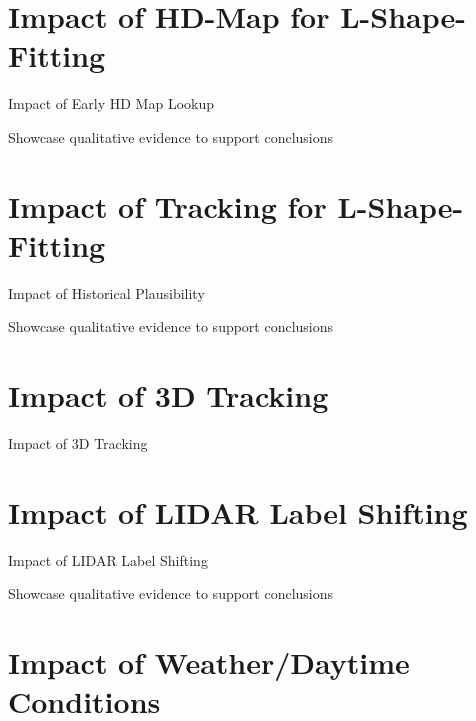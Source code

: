 \newpage


\section{Impact of HD-Map for L-Shape-Fitting}
\label{sec:impactearlymap}

Impact of Early HD Map Lookup

Showcase qualitative evidence to support conclusions

\newpage


\section{Impact of Tracking for L-Shape-Fitting}
\label{sec:impacthistplausibility}

Impact of Historical Plausibility

Showcase qualitative evidence to support conclusions

\newpage


\section{Impact of 3D Tracking}
\label{sec:impacttracking}

Impact of 3D Tracking

\newpage


\section{Impact of LIDAR Label Shifting}
\label{sec:impactlabelshifting}

Impact of LIDAR Label Shifting

Showcase qualitative evidence to support conclusions

\newpage


\section{Impact of Weather/Daytime Conditions}
\label{sec:weather}

